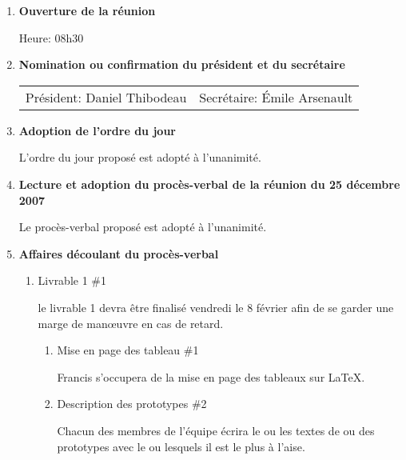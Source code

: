 \documentclass[12pt]{ULojpv}
\begin{document}
\entete
\begin{enumerate}
\item \textbf{Ouverture de la réunion}

Heure: 08h30


\item \textbf{Nomination ou confirmation du président et du secrétaire}

\begin{tabular}{@{}ll}
   Président: Daniel Thibodeau
   & Secrétaire: Émile Arsenault
\end{tabular}


\item \textbf{Adoption de l'ordre du jour}

L'ordre du jour proposé est adopté à l'unanimité.


\item \textbf{Lecture et adoption du procès-verbal de la réunion du 25 décembre 2007}

Le procès-verbal proposé est adopté à l'unanimité.


\item \textbf{Affaires découlant du procès-verbal}

\begin{enumerate}

\item Livrable 1 \#1

le livrable 1 devra être finalisé vendredi le 8 février afin de se garder une marge de manœuvre en cas de retard.

\begin{enumerate}

\item Mise en page des tableau \#1

Francis s'occupera de la mise en page des tableaux sur LaTeX. 


\item Description des prototypes  \#2

Chacun des membres de l'équipe écrira le ou les textes de ou des prototypes avec le ou lesquels il est le plus à l'aise.


\end{enumerate}
\end{enumerate}
\end{enumerate}
\end{document}
